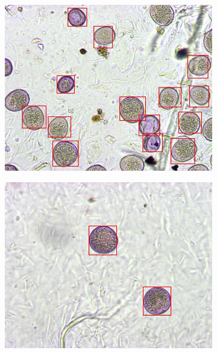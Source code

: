 \begin{figure}[htbp]
  \centering
  \begin{subfigure}[b]{0.4\textwidth}
    \centering
    \includegraphics[width=\textwidth]{figs/ex_04}
    \vspace*{0.02\textwidth}
  \end{subfigure}%
  \hspace*{0.04\textwidth}
  \begin{subfigure}[b]{0.4\textwidth}
    \centering
    \includegraphics[width=\textwidth]{figs/ex_03}
    \vspace*{0.02\textwidth}
  \end{subfigure}


\end{figure}
